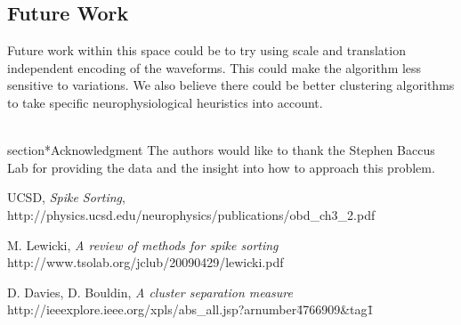 \documentclass[conference]{IEEEtran}
\begin{document}
\subsection{Future Work}
Future work within this space could be to try using scale and
translation independent encoding of the waveforms. This could make the
algorithm less sensitive to variations.  We also believe there could
be better clustering algorithms to take specific neurophysiological 
heuristics into account.


\\section*{Acknowledgment}
The authors would like to thank the Stephen Baccus Lab for providing
the data and the insight into how to approach this problem.


\begin{thebibliography}{1}


UCSD, \emph{Spike Sorting},
http://physics.ucsd.edu/neurophysics/publications/obd\_ch3\_2.pdf

M. Lewicki, \emph{A review of methods for spike sorting}
http://www.tsolab.org/jclub/20090429/lewicki.pdf

D. Davies, D. Bouldin, \emph{A cluster separation measure}
http://ieeexplore.ieee.org/xpls/abs\_all.jsp?arnumber\=4766909\&tag\=1


\end{thebibliography}
\end{document}
